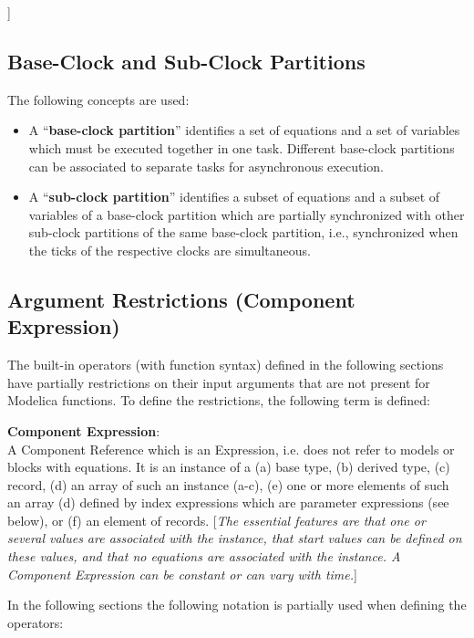 \documentclass[10pt,a4paper]{report}
\def\doublelabel#1{\label{#1}\hypertarget{#1}{}}
\begin{document}
{]}

\subsection{Base-Clock and Sub-Clock Partitions}\doublelabel{base-clock-and-sub-clock-partitions}

The following concepts are used:

\begin{itemize}
\item
  A ``\textbf{base-clock partition}'' identifies a set of equations and
  a set of variables which must be executed together in one task.
  Different base-clock partitions can be associated to separate tasks
  for asynchronous execution.
\item
  A ``\textbf{sub-clock partition}'' identifies a subset of equations
  and a subset of variables of a base-clock partition which are
  partially synchronized with other sub-clock partitions of the same
  base-clock partition, i.e., synchronized when the ticks of the
  respective clocks are simultaneous.
\end{itemize}

\subsection{Argument Restrictions (Component Expression)}\doublelabel{argument-restrictions-component-expression}

The built-in operators (with function syntax) defined in the following
sections have partially restrictions on their input arguments that are
not present for Modelica functions. To define the restrictions, the
following term is defined:

\textbf{Component Expression}:\\
A Component Reference which is an Expression, i.e. does not refer to
models or blocks with equations. It is an instance of a (a) base type,
(b) derived type, (c) record, (d) an array of such an instance (a-c),
(e) one or more elements of such an array (d) defined by index
expressions which are parameter expressions (see below), or (f) an
element of records. {[}\emph{The essential features are that one or
several values are associated with the instance, that start values can
be defined on these values, and that no equations are associated with
the instance. A Component Expression can be constant or can vary with
time.}{]}

In the following sections the following notation is partially used when
defining the operators:
\end{document}
